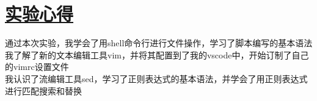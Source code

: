 \documentclass[a4paper,12pt]{article}
\begin{document}
\section{\underline{\color{blue}实验心得}}
通过本次实验，我学会了用shell命令行进行文件操作，学习了脚本编写的基本语法\\
我了解了新的文本编辑工具vim，并将其配置到了我的vscode中，开始订制了自己的vimrc设置文件\\
我认识了流编辑工具sed，学习了正则表达式的基本语法，并学会了用正则表达式进行匹配搜索和替换




\end{document}
